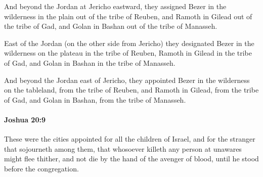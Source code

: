 			\begin{versebox}
					\item[BHS] 
					\item[ASV] And beyond the Jordan at Jericho eastward, they assigned Bezer in the wilderness in the plain out of the tribe of Reuben, and Ramoth in Gilead out of the tribe of Gad, and Golan in Bashan out of the tribe of Manasseh.
					\item[NIV] East of the Jordan (on the other side from Jericho) they designated Bezer in the wilderness on the plateau in the tribe of Reuben, Ramoth in Gilead in the tribe of Gad, and Golan in Bashan in the tribe of Manasseh.
					\item[NRSV] And beyond the Jordan east of Jericho, they appointed Bezer in the wilderness on the tableland, from the tribe of Reuben, and Ramoth in Gilead, from the tribe of Gad, and Golan in Bashan, from the tribe of Manasseh.
			\end{versebox}

		\paragraph{Joshua 20:9} %
			\label{JOSHUA-20-9}

			These were the cities appointed for all the children of Israel, and for the stranger that sojourneth among them, that whosoever killeth any person at unawares might flee thither, and not die by the hand of the avenger of blood, until he stood before the congregation.

